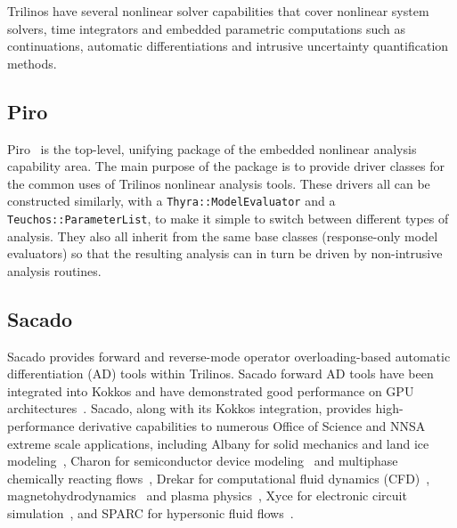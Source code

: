 

Trilinos have several nonlinear solver capabilities that cover nonlinear system solvers, time integrators and embedded parametric computations such as continuations, 
automatic differentiations and intrusive uncertainty quantification methods.

\subsection{Piro}

Piro~\cite{osti_1231283} is the top-level, unifying package of the embedded nonlinear analysis capability area. 
The main purpose of the package is to provide driver classes for the common uses of Trilinos nonlinear analysis tools. 
These drivers all can be constructed similarly, with a \lstinline{Thyra::ModelEvaluator} and a \lstinline{Teuchos::ParameterList}, 
to make it simple to switch between different types of analysis. 
They also all inherit from the same base classes (response-only model evaluators) so that the resulting analysis can 
in turn be driven by non-intrusive analysis routines.


\subsection{Sacado}

Sacado \cite{SacadoURL,phipps2012efficient,phipps2008large} provides forward and reverse-mode operator overloading-based automatic differentiation (AD) tools within Trilinos.
Sacado forward AD tools have been integrated into Kokkos and have demonstrated good performance on GPU architectures~\cite{phipps2022automatic}.
Sacado, along with its Kokkos integration, provides high-performance derivative capabilities to numerous Office of Science and NNSA extreme scale applications, including Albany for solid mechanics and land ice modeling~\cite{Salinger2016,MPASAlbany2018}, 
Charon for semiconductor device modeling~\cite{CharonUsersManual2020} and multiphase chemically reacting flows~\cite{Musson2009}, Drekar for computational fluid dynamics (CFD)~\cite{Sondak2021,Shadid2016}, magnetohydrodynamics~\cite{Shadid2016mhd} and 
plasma physics~\cite{Crockatt2022,Miller2019}, Xyce for electronic circuit simulation~\cite{xyceTrilinos,xycePCE}, and SPARC for hypersonic fluid flows~\cite{SparcValidation}. 

